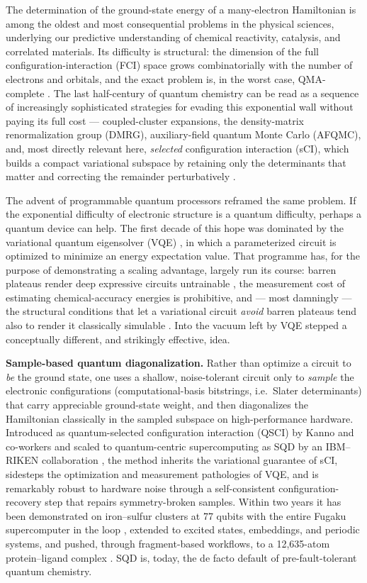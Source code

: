 \documentclass[11pt]{article}
\begin{document}
The determination of the ground-state energy of a many-electron Hamiltonian is among the oldest and most consequential problems in the physical sciences, underlying our predictive understanding of chemical reactivity, catalysis, and correlated materials. Its difficulty is structural: the dimension of the full configuration-interaction (FCI) space grows combinatorially with the number of electrons and orbitals, and the exact problem is, in the worst case, QMA-complete \cite{kempe2006}. The last half-century of quantum chemistry can be read as a sequence of increasingly sophisticated strategies for evading this exponential wall without paying its full cost --- coupled-cluster expansions, the density-matrix renormalization group (DMRG), auxiliary-field quantum Monte Carlo (AFQMC), and, most directly relevant here, \emph{selected} configuration interaction (sCI), which builds a compact variational subspace by retaining only the determinants that matter and correcting the remainder perturbatively \cite{huron1973,holmes2016,sharma2017,tubman2016}.

The advent of programmable quantum processors reframed the same problem. If the exponential difficulty of electronic structure is a quantum difficulty, perhaps a quantum device can help. The first decade of this hope was dominated by the variational quantum eigensolver (VQE) \cite{peruzzo2014}, in which a parameterized circuit is optimized to minimize an energy expectation value. That programme has, for the purpose of demonstrating a scaling advantage, largely run its course: barren plateaus render deep expressive circuits untrainable \cite{mcclean2018,larocca2025}, the measurement cost of estimating chemical-accuracy energies is prohibitive, and --- most damningly --- the structural conditions that let a variational circuit \emph{avoid} barren plateaus tend also to render it classically simulable \cite{cerezo2025}. Into the vacuum left by VQE stepped a conceptually different, and strikingly effective, idea.

\textbf{Sample-based quantum diagonalization.} Rather than optimize a circuit to \emph{be} the ground state, one uses a shallow, noise-tolerant circuit only to \emph{sample} the electronic configurations (computational-basis bitstrings, i.e.\ Slater determinants) that carry appreciable ground-state weight, and then diagonalizes the Hamiltonian classically in the sampled subspace on high-performance hardware. Introduced as quantum-selected configuration interaction (QSCI) by Kanno and co-workers \cite{kanno2023} and scaled to quantum-centric supercomputing as SQD by an IBM--RIKEN collaboration \cite{robledomoreno2025}, the method inherits the variational guarantee of sCI, sidesteps the optimization and measurement pathologies of VQE, and is remarkably robust to hardware noise through a self-consistent configuration-recovery step that repairs symmetry-broken samples. Within two years it has been demonstrated on iron--sulfur clusters at 77 qubits with the entire Fugaku supercomputer in the loop \cite{robledomoreno2025,shirakawa2025}, extended to excited states, embeddings, and periodic systems, and pushed, through fragment-based workflows, to a 12,635-atom protein--ligand complex \cite{wang2026}. SQD is, today, the de facto default of pre-fault-tolerant quantum chemistry.
\end{document}
